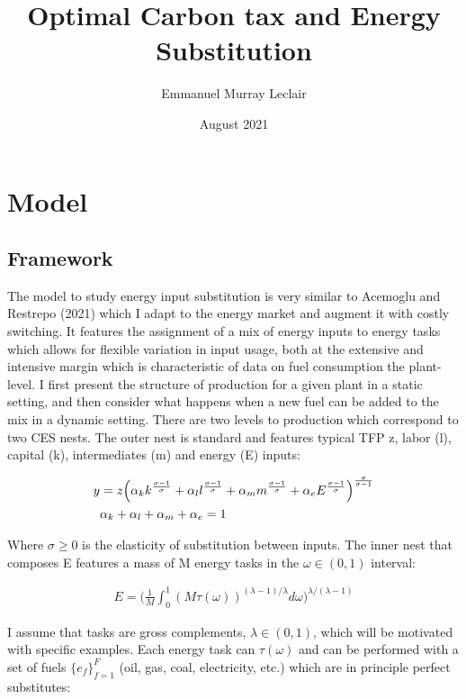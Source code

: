 \documentclass{article}
\title{Optimal Carbon tax and Energy Substitution}
\author{Emmanuel Murray Leclair}
\affil{Department of Economics, Western University}
\date{August 2021}
\begin{document}
\nocite{*}

\maketitle

\section{Model}

\subsection{Framework}

The model to study energy input substitution is very similar to Acemoglu and Restrepo (2021) which I adapt to the energy market and augment it with costly switching. It features the assignment of a mix of energy inputs to energy tasks which allows for flexible variation in input usage, both at the extensive and intensive margin which is characteristic of data on fuel consumption the plant-level. I first present the structure of production for a given plant in a static setting, and then consider what happens when a new fuel can be added to the mix in a dynamic setting. There are two levels to production which correspond to two CES nests. The outer nest is standard and features typical TFP z, labor (l), capital (k), intermediates (m) and energy (E) inputs:

\begin{align}
    y &= z\Big( \alpha_k k^{\frac{\sigma-1}{\sigma}} + \alpha_l l^{\frac{\sigma-1}{\sigma}} + \alpha_m m^{\frac{\sigma-1}{\sigma}} + \alpha_e E^{\frac{\sigma-1}{\sigma}}\Big)^{\frac{\sigma}{\sigma-1}} \\
    \notag &\alpha_k + \alpha_l + \alpha_m + \alpha_e = 1
\end{align}

Where $\sigma \geq 0$ is the elasticity of substitution between inputs. The inner nest that composes E features a mass of M energy tasks in the $\omega \in (0,1)$ interval:

\begin{align}
    E = \Big( \frac{1}{M} \int_{0}^1 (M\tau(\omega))^{(\lambda-1)/\lambda} d \omega \Big)^{\lambda/(\lambda-1)}
\end{align}

I assume that tasks are gross complements, $\lambda \in (0,1)$, which will be motivated with specific examples. Each energy task can $\tau(\omega)$ and can be performed with a set of fuels $\{e_f\}_{f=1}^F$ (oil, gas, coal, electricity, etc.) which are in principle perfect substitutes:
\end{document}
